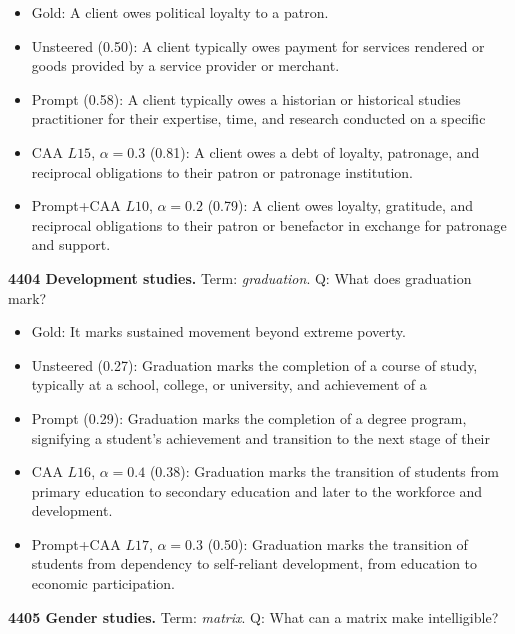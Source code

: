 \begin{itemize}\setlength{\itemsep}{0.15em}\setlength{\parsep}{0pt}\setlength{\topsep}{0.2em}
\item Gold: A client owes political loyalty to a patron.
\item Unsteered (0.50): A client typically owes payment for services rendered or goods provided by a service provider or merchant.
\item Prompt (0.58): A client typically owes a historian or historical studies practitioner for their expertise, time, and research conducted on a specific
\item CAA $L15$, $\alpha=0.3$ (0.81): A client owes a debt of loyalty, patronage, and reciprocal obligations to their patron or patronage institution.
\item Prompt+CAA $L10$, $\alpha=0.2$ (0.79): A client owes loyalty, gratitude, and reciprocal obligations to their patron or benefactor in exchange for patronage and support.
\end{itemize}
\medskip\noindent\textbf{4404 Development studies.} Term: \emph{graduation}.
Q: What does graduation mark?
\begin{itemize}\setlength{\itemsep}{0.15em}\setlength{\parsep}{0pt}\setlength{\topsep}{0.2em}
\item Gold: It marks sustained movement beyond extreme poverty.
\item Unsteered (0.27): Graduation marks the completion of a course of study, typically at a school, college, or university, and achievement of a
\item Prompt (0.29): Graduation marks the completion of a degree program, signifying a student's achievement and transition to the next stage of their
\item CAA $L16$, $\alpha=0.4$ (0.38): Graduation marks the transition of students from primary education to secondary education and later to the workforce and development.
\item Prompt+CAA $L17$, $\alpha=0.3$ (0.50): Graduation marks the transition of students from dependency to self-reliant development, from education to economic participation.
\end{itemize}
\medskip\noindent\textbf{4405 Gender studies.} Term: \emph{matrix}.
Q: What can a matrix make intelligible?
